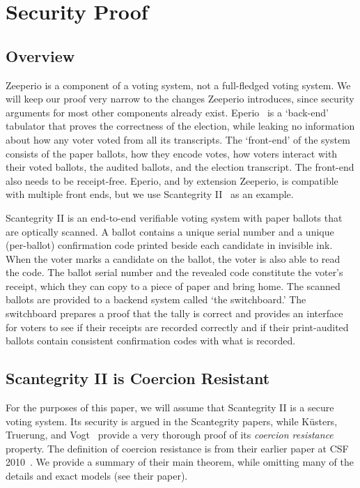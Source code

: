 

\section{Security Proof}
\label{app:sec}

\subsection{Overview}

Zeeperio is a component of a voting system, not a full-fledged voting system. We will keep our proof very narrow to the changes Zeeperio introduces, since security arguments for most other components already exist. Eperio~\cite{ECHA10} is a `back-end' tabulator that proves the correctness of the election, while leaking no information about how any voter voted from all its transcripts. The `front-end' of the system consists of the paper ballots, how they encode votes, how voters interact with their voted ballots, the audited ballots, and the election transcript. The front-end also needs to be receipt-free. Eperio, and by extension Zeeperio, is compatible with multiple front ends, but we use Scantegrity II~\cite{CCC+08} as an example.

Scantegrity II is an end-to-end verifiable voting system with paper ballots that are optically scanned. A ballot contains a unique serial number and a unique (per-ballot) confirmation code printed beside each candidate in invisible ink. When the voter marks a candidate on the ballot, the voter is also able to read the code. The ballot serial number and the revealed code constitute the voter's receipt, which they can copy to a piece of paper and bring home. The scanned ballots are provided to a backend system called `the switchboard.' The switchboard prepares a proof that the tally is correct and provides an interface for voters to see if their receipts are recorded correctly and if their print-audited ballots contain consistent confirmation codes with what is recorded.

\subsection{Scantegrity II is Coercion Resistant}
\label{sec:stii-coercion}
For the purposes of this paper, we will assume that Scantegrity II is a secure voting system. Its security is argued in the Scantegrity papers, while K{\"u}sters, Truerung, and Vogt~\cite {KTV10c} provide a very thorough proof of its \textit{coercion resistance} property. The definition of coercion resistance is from their earlier paper at CSF 2010~\cite{KTV10}. We provide a summary of their main theorem, while omitting many of the details and exact models (see their paper).

